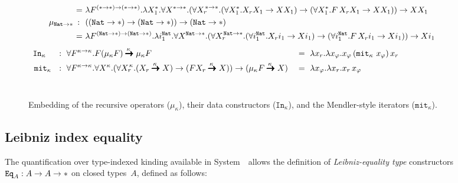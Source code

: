 \begin{figure*}
\begin{align*}
&            &\!\!\!\!\!=~&
  \l F^{(*-> *) -> (*-> *)}.\l X_1^{*}.
   \forall X^{* -> *}.(\forall {X_r}^{\!\!* -> *}.
   (\forall X_1^{*}.X_r X_1 -> X X_1) -> (\forall X_1^{*}.F\,X_r X_1 -> X X_1)) -> X X_1 \\
  &\mu_{\mathtt{Nat}-> *} &\!\!\!\!\!~:~~& ((\mathtt{Nat} -> *) -> (\mathtt{Nat} -> *)) -> (\mathtt{Nat} -> *) \\
&            &\!\!\!\!\!=~&
  \l F^{(\mathtt{Nat}-> *) -> (\mathtt{Nat}-> *)}.\l i_1^\mathtt{Nat}.
  \forall X^{\mathtt{Nat} -> *}.(\forall {X_r}^{\!\!\mathtt{Nat} -> *}.
  (\forall i_1^\mathtt{Nat}.X_r i_1 -> X i_1) -> (\forall i_1^\mathtt{Nat}.F\,X_r i_1 -> X i_1)) -> X i_1 \qquad\qquad
\end{align*}
\begin{align*}
\mathtt{In}_{\kappa} \,~\,&~~:~ \forall F^{\kappa-> \kappa}.
	F(\mu_\kappa F) \stackrel{\kappa\;}{\pmb{\pmb{->}}} \mu_\kappa F
&&=~ \lambda x_r. \lambda x_\varphi.x_\varphi\,(\mathtt{mit}_\kappa~x_\varphi)\,x_r
	\qquad~\qquad~\qquad~\qquad~\quad \\
\mathtt{mit}_\kappa &~~:~ \forall F^{\kappa-> \kappa}.\forall X^\kappa.
	(\forall {X_r}^{\!\!\kappa}.
	 (X_r \stackrel{\kappa\;}{\pmb{\pmb{->}}} X) ->
	 (F X_r \stackrel{\kappa\;}{\pmb{\pmb{->}}} X) ) ->
	(\mu_\kappa F \stackrel{\kappa\;}{\pmb{\pmb{->}}} X)
&&=~ \lambda x_\varphi.\lambda x_r.x_r\,x_\varphi
\end{align*} ~ \vspace*{-10pt}
\caption{Embedding of the recursive operators ($\mu_\kappa$),
	their data constructors ($\mathtt{In}_\kappa$),
	and the Mendler-style iterators ($\mathtt{mit}_\kappa$).}
\label{fig:mu}
\end{figure*}

\subsection{Leibniz index equality}
\label{Leibniz}

The quantification over type-indexed kinding available in System~\Fi\
allows the definition of \emph{Leibniz-equality type} constructors
$\mathtt{Eq}_A: A\to A\to *$ on closed types~$A$, defined as follows:

